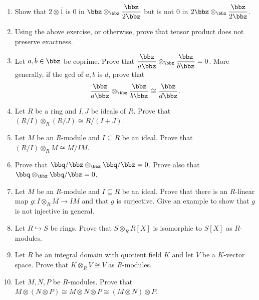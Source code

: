 \begin{enumerate}[label=\arabic*.]

\item Show that $2 \otimes \overline 1$ is $0$ in $\bbz \otimes_{\bbz} \dfrac{\bbz}{2\bbz}$ but is not $0$ in $2\bbz \otimes_{\bbz} \dfrac{\bbz}{2\bbz}$.

\item Using the above exercise, or otherwise, prove that tensor product does not preserve exactness.

\item Let $a,b \in \bbz$ be coprime. Prove that $\dfrac{\bbz}{a\bbz} \otimes_{\bbz} \dfrac{\bbz}{b\bbz} = 0$. More generally, if the gcd of $a,b$ is $d$, prove that
\[
\frac{\bbz}{a\bbz} \otimes_{\bbz} \frac{\bbz}{b\bbz} \cong \frac{\bbz}{d\bbz}.
\]

\item Let $R$ be a ring and $I,J$ be ideals of $R$. Prove that $(R/I) \otimes_R (R/J) \cong R/(I+J)$.

\item Let $M$ be an $R$-module and $I \subseteq R$ be an ideal. Prove that $(R/I) \otimes_R M \cong M/IM$.

\item Prove that $\bbq/\bbz \otimes_{\bbz} \bbq/\bbz = 0$. Prove also that $\bbq \otimes_{\bbz} \bbq/\bbz = 0$.

\item Let $M$ be an $R$-module and $I \subseteq R$ be an ideal. Prove that there is an $R$-linear map $g: I \otimes_R M \to IM$ and that $g$ is surjective. Give an example to show that $g$ is not injective in general.

\item Let $R \hookrightarrow S$ be rings. Prove that $S \otimes_R R[X]$ is isomorphic to $S[X]$ as $R$-modules.

\item Let $R$ be an integral domain with quotient field $K$ and let $V$ be a $K$-vector space. Prove that $K \otimes_R V \cong V$ as $R$-modules.

\item Let $M,N,P$ be $R$-modules. Prove that $M \otimes (N\otimes P) \cong M\otimes N \otimes P \cong (M\otimes N)\otimes P$.

\end{enumerate}